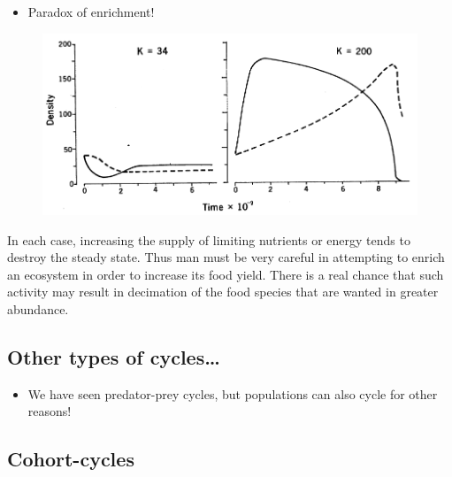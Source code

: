\documentclass[
  letterpaper,
  DIV=11,
  numbers=noendperiod]{scrartcl}
\providecommand{\tightlist}{%
  \setlength{\itemsep}{0pt}\setlength{\parskip}{0pt}}\usepackage{longtable,booktabs,array}
\begin{document}
\begin{itemize}
\tightlist
\item
  Paradox of enrichment!
\end{itemize}

\begin{figure}

{\centering \includegraphics{images/paradox.png}

}

\end{figure}

In each case, increasing the supply of limiting nutrients or energy
tends to destroy the steady state. Thus man must be very careful in
attempting to enrich an ecosystem in order to increase its food yield.
There is a real chance that such activity may result in decimation of
the food species that are wanted in greater abundance.

\hypertarget{other-types-of-cycles}{%
\subsection{Other types of cycles\ldots{}}\label{other-types-of-cycles}}

\begin{itemize}
\tightlist
\item
  We have seen predator-prey cycles, but populations can also cycle for
  other reasons!
\end{itemize}

\hypertarget{cohort-cycles}{%
\subsection{Cohort-cycles}\label{cohort-cycles}}
\end{document}
